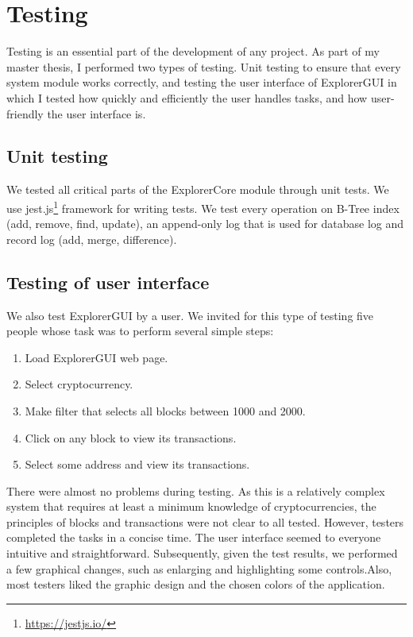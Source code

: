 \chapter{Testing}
Testing is an essential part of the development of any project. As part of my master thesis, I performed two types of testing. Unit testing to ensure that every system module works correctly, and testing the user interface of ExplorerGUI in which I tested how quickly and efficiently the user handles tasks, and how user-friendly the user interface is.

\section{Unit testing}
We tested all critical parts of the ExplorerCore module through unit tests. We use jest.js\footnote{\url{https://jestjs.io/}} framework for writing tests. We test every operation on B-Tree index (add, remove, find, update), an append-only log that is used for database log and record log (add, merge, difference).


\section{Testing of user interface}
We also test ExplorerGUI by a user. We invited for this type of testing five people whose task was to perform several simple steps:
\begin{enumerate}
    \item Load ExplorerGUI web page.
    \item Select cryptocurrency.
    \item Make filter that selects all blocks between 1000 and 2000.
    \item Click on any block to view its transactions.
    \item Select some address and view its transactions.
\end{enumerate}
There were almost no problems during testing. As this is a relatively complex system that requires at least a minimum knowledge of cryptocurrencies, the principles of blocks and transactions were not clear to all tested. However, testers completed the tasks in a concise time. The user interface seemed to everyone intuitive and straightforward. Subsequently, given the test results, we performed a few graphical changes, such as enlarging and highlighting some controls.Also, most testers liked the graphic design and the chosen colors of the application.